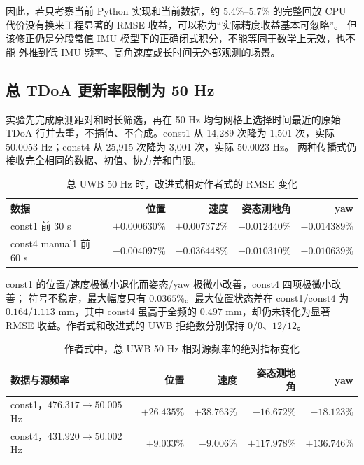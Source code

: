 \documentclass[11pt,a4paper]{ctexart}
\begin{document}
因此，若只考察当前 Python 实现和当前数据，约 $5.4\%$--$5.7\%$ 的完整回放
CPU 代价没有换来工程显著的 RMSE 收益，可以称为``实际精度收益基本可忽略''。
但该修正仍是分段常值 IMU 模型下的正确闭式积分，不能等同于数学上无效，也不能
外推到低 IMU 频率、高角速度或长时间无外部观测的场景。

\subsection{总 TDoA 更新率限制为 50 Hz}

实验先完成原测距对和时长筛选，再在 50 Hz 均匀网格上选择时间最近的原始 TDoA
行并去重，不插值、不合成。const1 从 14,289 次降为 1,501 次，实际
$50.0053$ Hz；const4 从 25,915 次降为 3,001 次，实际 $50.0023$ Hz。
两种传播式仍接收完全相同的数据、初值、协方差和门限。

\begin{table}[H]
\centering
\small
\caption{总 UWB 50 Hz 时，改进式相对作者式的 RMSE 变化}
\begin{tabular}{lrrrr}
\toprule
数据 & 位置 & 速度 & 姿态测地角 & yaw\\
\midrule
const1 前 30 s
 & $+0.000630\%$ & $+0.007372\%$ & $-0.012440\%$ & $-0.014389\%$\\
const4 manual1 前 60 s
 & $-0.004097\%$ & $-0.036448\%$ & $-0.010310\%$ & $-0.010639\%$\\
\bottomrule
\end{tabular}
\end{table}

const1 的位置/速度极微小退化而姿态/yaw 极微小改善，const4 四项极微小改善；
符号不稳定，最大幅度只有 $0.0365\%$。最大位置状态差在 const1/const4 为
$0.164/1.113$ mm，其中 const4 虽高于全频的 $0.497$ mm，却仍未转化为显著
RMSE 收益。作者式和改进式的 UWB 拒绝数分别保持 $0/0$、$12/12$。

\begin{table}[H]
\centering
\small
\caption{作者式中，总 UWB 50 Hz 相对源频率的绝对指标变化}
\begin{tabular}{lrrrr}
\toprule
数据与源频率 & 位置 & 速度 & 姿态测地角 & yaw\\
\midrule
const1，$476.317\to50.005$ Hz
 & $+26.435\%$ & $+38.763\%$ & $-16.672\%$ & $-18.123\%$\\
const4，$431.920\to50.002$ Hz
 & $+9.033\%$ & $-9.006\%$ & $+117.978\%$ & $+136.746\%$\\
\bottomrule
\end{tabular}
\end{table}
\end{document}

